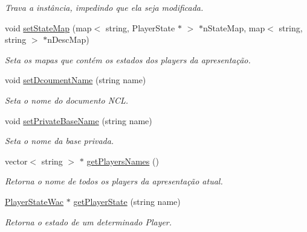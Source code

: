 \begin{DoxyCompactItemize}
\begin{DoxyCompactList}\small\item\em Trava a instância, impedindo que ela seja modificada. \item\end{DoxyCompactList}\item 
void \hyperlink{classbr_1_1ufscar_1_1lince_1_1ginga_1_1wac_1_1state_1_1PresentationState_aa288af47b8342244e574e36a3564a933}{setStateMap} (map$<$ string, PlayerState $\ast$ $>$ $\ast$nStateMap, map$<$ string, string $>$ $\ast$nDescMap)
\begin{DoxyCompactList}\small\item\em Seta os mapas que contém os estados dos players da apresentação. \item\end{DoxyCompactList}\item 
void \hyperlink{classbr_1_1ufscar_1_1lince_1_1ginga_1_1wac_1_1state_1_1PresentationState_aadc7632e1bff7b0c2680a5193679e1d9}{setDcoumentName} (string name)
\begin{DoxyCompactList}\small\item\em Seta o nome do documento NCL. \item\end{DoxyCompactList}\item 
void \hyperlink{classbr_1_1ufscar_1_1lince_1_1ginga_1_1wac_1_1state_1_1PresentationState_a127842284622579c23ec1d6ce974fe8f}{setPrivateBaseName} (string name)
\begin{DoxyCompactList}\small\item\em Seta o nome da base privada. \item\end{DoxyCompactList}\item 
vector$<$ string $>$ $\ast$ \hyperlink{classbr_1_1ufscar_1_1lince_1_1ginga_1_1wac_1_1state_1_1PresentationState_ad1d032b0daa21d879958a0bdfa3ab50e}{getPlayersNames} ()
\begin{DoxyCompactList}\small\item\em Retorna o nome de todos os players da apresentação atual. \item\end{DoxyCompactList}\item 
\hyperlink{classbr_1_1ufscar_1_1lince_1_1ginga_1_1wac_1_1state_1_1PlayerStateWac}{PlayerStateWac} $\ast$ \hyperlink{classbr_1_1ufscar_1_1lince_1_1ginga_1_1wac_1_1state_1_1PresentationState_aec08164fc9e175efb9e9b1658fbefafb}{getPlayerState} (string name)
\begin{DoxyCompactList}\small\item\em Retorna o estado de um determinado Player. \item\end{DoxyCompactList}\item 

\end{DoxyCompactItemize}
